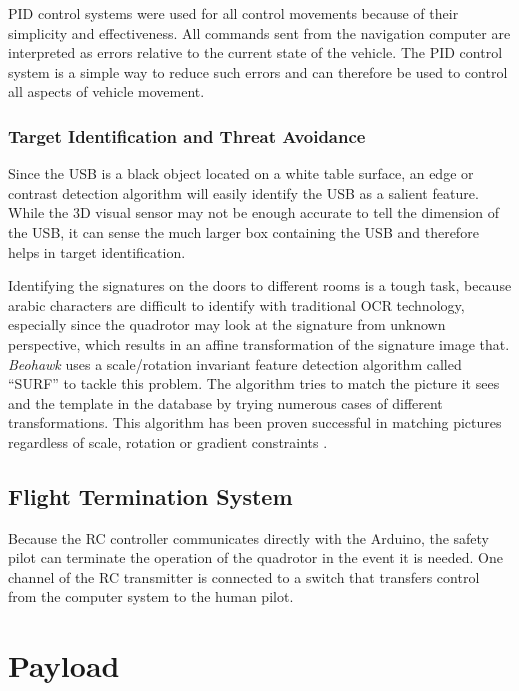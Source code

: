 \documentclass[12pt, letterpaper]{article}
\begin{document}
PID control systems were used for all control movements because of their simplicity and effectiveness. All commands sent from the navigation computer are interpreted as errors relative to the current state of the vehicle. The PID control system is a simple way to reduce such errors and can therefore be used to control all aspects of vehicle movement.

\subsubsection{Target Identification and Threat Avoidance}

Since the USB is a black object located on a white table surface, an edge or contrast detection algorithm will easily identify the USB as a salient feature. While the 3D visual sensor may not be enough accurate to tell the dimension of the USB, it can sense the much larger box containing the USB and therefore helps in target identification. 

Identifying the signatures on the doors to different rooms is a tough task, because arabic characters are difficult to identify with traditional OCR technology, especially since the quadrotor may look at the signature from unknown perspective, which results in an affine transformation of the signature image that. \textit{Beohawk} uses a scale/rotation invariant feature detection algorithm called ``SURF'' to tackle this problem. The algorithm tries to match the picture it sees and the template in the database by trying numerous cases of different transformations. This algorithm has been proven successful in matching pictures regardless of scale, rotation or gradient constraints .


\subsection{Flight Termination System}
Because the RC controller communicates directly with the Arduino, the safety pilot can terminate the operation of the quadrotor in the event it is needed. One channel of the RC transmitter is connected to a switch that transfers control from the computer system to the human pilot.


\section{Payload}
\end{document}
